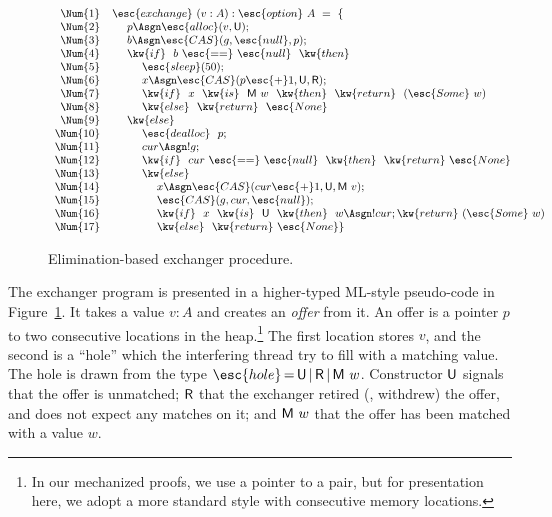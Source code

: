 {
\setlength{\belowcaptionskip}{-10pt} 
\begin{figure}
\centering
\[
{\small{
\begin{array}{rl}
 \Num{1} & \esc{exchange}~(v : A) : \esc{option}~A~=~\{ 
\\ 
 \Num{2} & ~~~~ p \Asgn \esc{alloc}(v, \Unmatched);\\
 \Num{3} & ~~~~ b \Asgn \esc{CAS}(g, \esc{null}, p);\\
 \Num{4} & ~~~~ \kw{if}~~b~\esc{==}~\esc{null}~~\kw{then}\\
 \Num{5} & ~~~~ ~~~~ \esc{sleep}(50);\\
 \Num{6} & ~~~~ ~~~~ x \Asgn \esc{CAS}(p\esc{+}1, \Unmatched, \Retired);\\
 \Num{7} & ~~~~ ~~~~ \kw{if}~~x~~\kw{is}~~\Matched w~~\kw{then}~~\kw{return}~~(\esc{Some}~w)\\
 \Num{8} & ~~~~ ~~~~ \kw{else}~~\kw{return}~~\esc{None}\\
 \Num{9} & ~~~~ \kw{else}\\
\Num{10} & ~~~~ ~~~~ \esc{dealloc}~~p;\\
\Num{11} & ~~~~ ~~~~ cur \Asgn !g;\\
\Num{12} & ~~~~ ~~~~ \kw{if}~~cur~\esc{==}~\esc{null}~~\kw{then}~~\kw{return}~{\esc{None}}\\
\Num{13} & ~~~~ ~~~~ \kw{else}\\
\Num{14} & ~~~~ ~~~~ ~~~~ x \Asgn \esc{CAS}(cur\esc{+}1, \Unmatched, \Matched v);\\
\Num{15} & ~~~~ ~~~~ ~~~~ \esc{CAS}(g, cur, \esc{null});\\
\Num{16} & ~~~~ ~~~~ ~~~~ \kw{if}~~x~~\kw{is}~~\Unmatched~~\kw{then}~~w\Asgn !cur;\kw{return}~(\esc{Some}\ w)\\
\Num{17} & ~~~~ ~~~~ ~~~~ \kw{else}~~\kw{return}~\esc{None}\}
\end{array}
}}
\]
\caption{Elimination-based exchanger procedure.}
\label{fig:exchanger}
\end{figure} 
}

The exchanger program is presented in a higher-typed ML-style
pseudo-code in Figure~\ref{fig:exchanger}. It takes a value $v : A$
and creates an \emph{offer} from it. An offer is a pointer $p$ to two
consecutive locations in the heap.\footnote{In our mechanized proofs,
  we use a pointer to a pair, but for presentation here, we adopt a
  more standard style with consecutive memory locations.} The first
location stores $v$, and the second is a ``hole'' which the
interfering thread try to fill with a matching value. The hole is
drawn from the type
$\esc{hole}\,{=}\,\Unmatched\,{\mid}\,\Retired\,{\mid}\,\Matched
w$. Constructor ${\mathsf{U}}$ signals that the offer is unmatched;
${\mathsf{R}}$ that the exchanger retired (\ie, withdrew) the offer, and
does not expect any matches on it; and ${\mathsf{M}\ w}$ that the offer has
been matched with a value $w$.

